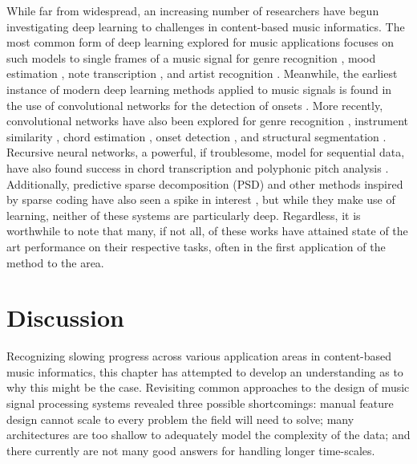 While far from widespread, an increasing number of researchers have begun investigating deep learning to challenges in content-based music informatics.
The most common form of deep learning explored for music applications focuses on such models to single frames of a music signal for genre recognition \cite{Hamel2009Automatic}, mood estimation \cite{Schmidt2011Modeling}, note transcription \cite{Nam2011Classification}, and artist recognition \cite{Dieleman2011Audio}.
Meanwhile, the earliest instance of modern deep learning methods applied to music signals is found in the use of convolutional networks for the detection of onsets \cite{Lacoste2007Supervised}.
More recently, convolutional networks have also been explored for genre recognition \cite{Li2010Automatic}, instrument similarity \cite{Humphrey2010Nonlinear}, chord estimation \cite{Humphrey2011Learning, Humphrey2012Rethinking}, onset detection \cite{Schluter2014Improved}, and structural segmentation \cite{Ullrich2014Boundary}.
Recursive neural networks, a powerful, if troublesome, model for sequential data, have also found success in chord transcription \cite{Boulanger2013Audio} and polyphonic pitch analysis \cite{Sigtia2014RNN}.
Additionally, predictive sparse decomposition (PSD) and other methods inspired by sparse coding have also seen a spike in interest \cite{Henaff2011Unsupervised, Nam2012Learning}, but while they make use of learning, neither of these systems are particularly deep.
Regardless, it is worthwhile to note that many, if not all, of these works have attained state of the art performance on their respective tasks, often in the first application of the method to the area.



\section{Discussion}
\label{sec:discussion}

Recognizing slowing progress across various application areas in content-based music informatics, this chapter has attempted to develop an understanding as to why this might be the case.
Revisiting common approaches to the design of music signal processing systems revealed three possible shortcomings:
manual feature design cannot scale to every problem the field will need to solve;
many architectures are too shallow to adequately model the complexity of the data;
and there currently are not many good answers for handling longer time-scales.

